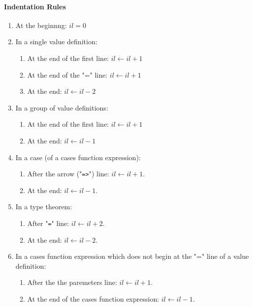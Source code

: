 \documentclass{article}
\begin{document}
\paragraph{Indentation Rules}
\begin{enumerate}

\item
At the beginnng: $il = 0$

\item
In a single value definition:
  \begin{enumerate}

  \item
  At the end of the first line: $il \leftarrow il + 1$

  \item
  At the end of the "=" line: $il \leftarrow il + 1$

  \item
  At the end: $il \leftarrow il - 2$
  \end{enumerate}

\item
In a group of value definitions:
  \begin{enumerate}

  \item
  At the end of the first line: $il \leftarrow il + 1$

  \item
  At the end: $il \leftarrow il - 1$
  \end{enumerate}

\item
In a case (of a cases function expression):
  \begin{enumerate}

  \item
  After the arrow ("\verb|=>|") line: $il \leftarrow il + 1$.

  \item
  At the end: $il \leftarrow il - 1$.
  \end{enumerate}

\item
In a type theorem:
  \begin{enumerate}

  \item
  After "\verb|=|" line: $il \leftarrow il + 2$.

  \item
  At the end: $il \leftarrow il - 2$.
  \end{enumerate}

\item
In a cases function expression which does not begin at the "=" line of a value
definition:
  \begin{enumerate}

  \item
  After the the paremeters line: $il \leftarrow il + 1$.

  \item
  At the end of the cases function expression: $il \leftarrow il - 1$.

  \end{enumerate}

\end{enumerate}
\end{document}
